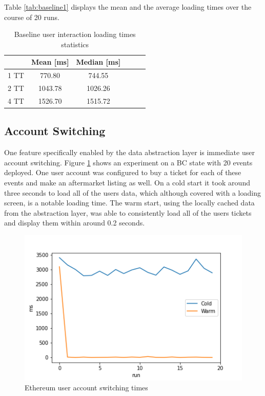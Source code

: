 Table \ref{tab:baseline1} displays the mean and the average loading times over the course of 20 runs.


\begin{table}[ht]
\centering
\begin{tabular}{|c|c|c|c|c|c|}
\hline
 & \textbf{Mean [ms]} & \textbf{Median [ms]} \\ \hline
1 TT & 770.80             & 744.55      \\ \hline
2 TT & 1043.78             & 1026.26       \\ \hline
4 TT & 1526.70               & 1515.72        \\ \hline
\end{tabular}
\caption{Baseline user interaction loading times statistics}
\label{tab:baseline2}
\end{table}


\subsection{Account Switching}\label{section:account-switching}

One feature specifically enabled by the data abstraction layer is immediate user account switching. Figure \ref{img:user_int} shows an experiment on a BC state with 20 events deployed. One user account was configured to buy a ticket for each of these events and make an aftermarket listing as well. On a cold start it took around three seconds to load all of the users data, which although covered with a loading screen, is a notable loading time. The warm start, using the locally cached data from the abstraction layer, was able to consistently load all of the users tickets and display them within around 0.2 seconds.

\begin{figure}[H]
    \centering
    \includegraphics[width=14cm]{images/plot3.png}
    \caption{Ethereum user account switching times}
    \label{img:user_int}
\end{figure}


